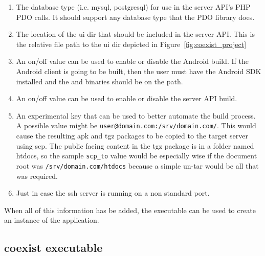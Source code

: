 \begin{enumerate}
\item {} The database type (i.e. mysql, postgresql) for use in the server
  API's PHP PDO calls. It should support any database type that the PDO library
  does.

\item {} The location of the ui dir that should be included in the server
  API. This is the relative file path to the ui dir depicted in
  Figure~\ref{fig:coexist_project}

\item {} An on/off value can be used to enable or disable the Android
  build. If the Android client is going to be built, then the user must have the
  Android SDK installed and the  and  binaries should be on
  the path.

\item {} An on/off value can be used to enable or disable the server API
  build.

\item {} An experimental key that can be used to better automate the
  build process. A possible value might be
  \texttt{user@domain.com:/srv/domain.com/}. This would cause the resulting apk and
  tgz packages to be copied to the target server using scp. The public facing
  content in the tgz package is in a folder named htdocs, so the sample
  \texttt{scp\_to} value would be especially wise if the document root was
  \texttt{/srv/domain.com/htdocs} because a simple un-tar would be all that was
  required. 

\item {} Just in case the ssh server is running on a non standard
  port.

\end{enumerate}

When all of this information has be added, the  executable can be
used to create an instance of the application.

\subsection{coexist executable}  \label{sec:exe}


